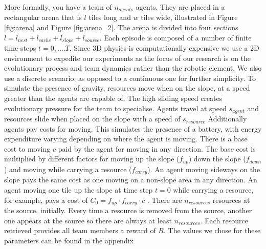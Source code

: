 \documentclass[12pt]{article}
\begin{document}
More formally, you have a team of $n_{agents}$ agents. 
They are placed in a rectangular arena that is $l$ tiles long and $w$ tiles wide, illustrated in Figure \ref{fig:arena} and Figure \ref{fig:arena_2}. 
The arena is divided into four sections $l= l_{nest} + l_{cache} + l_{slope} + l_{source}$.
Each episode is composed of a number of finite time-steps $t=0, .... T$. 
Since 3D physics is computationally expensive we use a 2D environment to expedite our experiments as the focus of our research is on the evolutionary process and team dynamics rather than the robotic element.
We also use a discrete scenario, as opposed to a continuous one for further simplicity.
To simulate the presence of gravity, resources move when on the slope, at a speed greater than the agents are capable of.
The high sliding speed creates evolutionary pressure for the team to specialise.
Agents travel at speed $s_{agent}$ and resources slide when placed on the slope with a speed of $s_{resource}$ 
Additionally agents pay costs for moving.
This simulates the presence of a battery, with energy expenditure varying depending on where the agent is moving.
There is a base cost to moving $c$ paid by the agent for moving in any direction.
The base cost is multiplied by different factors for moving up the slope ($f_{up}$) down the slope ($f_{down}$) and moving while carrying a resource ($f_{carry}$). 
An agent moving sideways on the slope pays the same cost as one moving on a non-slope area in any direction.
An agent moving one tile up the slope at time step $t=0$ while carrying a resource, for example, pays a cost of $C_{0} = f_{up} \cdot f_{carry} \cdot c$ .
There are $n_{resources}$ resources at the source, initially.
Every time a resource is removed from the source, another one appears at the source so there are always at least $n_{resources}$.
Each resource retrieved provides all team members a reward of $R$.
The values we chose for these parameters can be found in the appendix\\
\end{document}
